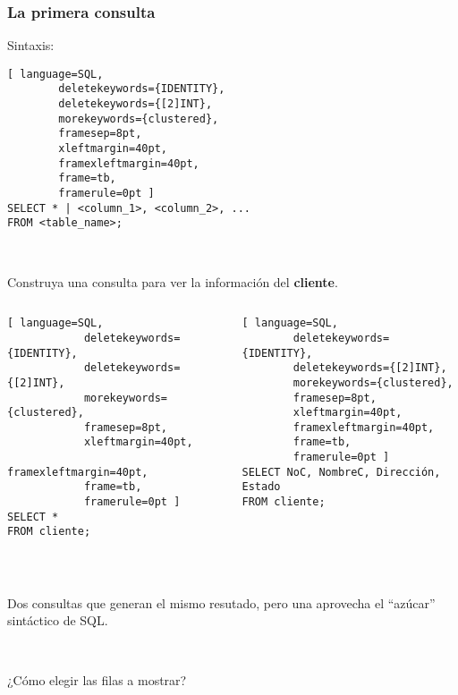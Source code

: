 
\begin{frame}[fragile]
	
	\frametitle{La primera consulta}
	
	Sintaxis:
	\begin{lstlisting}[ language=SQL,
		deletekeywords={IDENTITY},
		deletekeywords={[2]INT},
		morekeywords={clustered},
		framesep=8pt,
		xleftmargin=40pt,
		framexleftmargin=40pt,
		frame=tb,
		framerule=0pt ]
SELECT * | <column_1>, <column_2>, ...
FROM <table_name>;
\end{lstlisting}

	\ 
	
		
	Construya una consulta para ver la información del \textbf{cliente}.
	
	\pause

	\begin{columns}[t]
		\begin{lstlisting}[ language=SQL,
			deletekeywords={IDENTITY},
			deletekeywords={[2]INT},
			morekeywords={clustered},
			framesep=8pt,
			xleftmargin=40pt,
			framexleftmargin=40pt,
			frame=tb,
			framerule=0pt ]
SELECT *
FROM cliente;
\end{lstlisting}
	
	
		\begin{lstlisting}[ language=SQL,
		deletekeywords={IDENTITY},
		deletekeywords={[2]INT},
		morekeywords={clustered},
		framesep=8pt,
		xleftmargin=40pt,
		framexleftmargin=40pt,
		frame=tb,
		framerule=0pt ]
SELECT NoC, NombreC, Dirección, Estado
FROM cliente;
\end{lstlisting}
	
	\end{columns}
	
	\pause
	
	\ 
	
	Dos consultas que generan el mismo resutado, pero una aprovecha el ``azúcar'' sintáctico de SQL.
	
	\pause
	
	\ 
	
	\textcolor{codepurple}{¿Cómo elegir las filas a mostrar?}
			
\end{frame}



